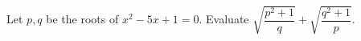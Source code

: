 Let $p,q$ be the roots of $x^2-5x+1=0$. Evaluate $\sqrt{\dfrac{p^2+1}{q}}+\sqrt{\dfrac{q^2+1}{p}}$.

